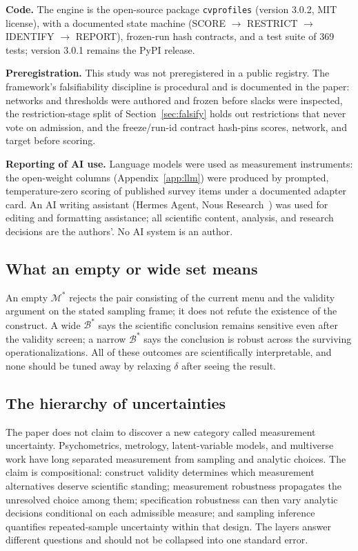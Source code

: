 \documentclass[10pt,letterpaper]{article}
\newcommand{\cvp}{\texttt{cvprofiles}}
\newcommand{\M}{\ensuremath{\mathcal{M}}}
\newcommand{\Bset}{\mathcal{B}}
\begin{document}
\textbf{Code.}
The engine is the open-source package \cvp{} (version 3.0.2, MIT license), with a documented state machine (SCORE $\to$ RESTRICT $\to$ IDENTIFY $\to$ REPORT), frozen-run hash contracts, and a test suite of 369 tests; version 3.0.1 remains the PyPI release.

\textbf{Preregistration.}
This study was not preregistered in a public registry.
The framework's falsifiability discipline is procedural and is documented in the paper: networks and thresholds were authored and frozen before slacks were inspected, the restriction-stage split of Section~\ref{sec:falsify} holds out restrictions that never vote on admission, and the freeze/run-id contract hash-pins scores, network, and target before scoring.

\textbf{Reporting of AI use.}
Language models were used as measurement instruments: the open-weight columns (Appendix~\ref{app:llm}) were produced by prompted, temperature-zero scoring of published survey items under a documented adapter card.
An AI writing assistant (Hermes Agent, Nous Research~\cite{hermesagent}) was used for editing and formatting assistance; all scientific content, analysis, and research decisions are the authors'.
No AI system is an author.

\subsection{What an empty or wide set means}
An empty $\M^*$ rejects the pair consisting of the current menu and the validity argument on the stated sampling frame; it does not refute the existence of the construct.
A wide $\Bset^*$ says the scientific conclusion remains sensitive even after the validity screen; a narrow $\Bset^*$ says the conclusion is robust across the surviving operationalizations.
All of these outcomes are scientifically interpretable, and none should be tuned away by relaxing $\delta$ after seeing the result.

\subsection{The hierarchy of uncertainties}
The paper does not claim to discover a new category called measurement uncertainty.
Psychometrics, metrology, latent-variable models, and multiverse work have long separated measurement from sampling and analytic choices.
The claim is compositional: construct validity determines which measurement alternatives deserve scientific standing; measurement robustness propagates the unresolved choice among them; specification robustness can then vary analytic decisions conditional on each admissible measure; and sampling inference quantifies repeated-sample uncertainty within that design.
The layers answer different questions and should not be collapsed into one standard error.
\end{document}

